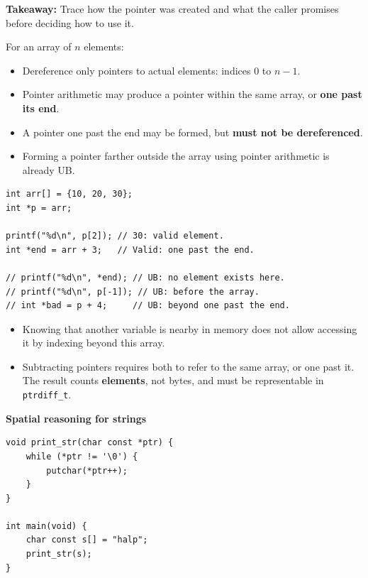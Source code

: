 \documentclass[11pt,a4paper]{article}
\begin{document}
\textbf{Takeaway:}
Trace how the pointer was created and what the caller promises
before deciding how to use it.


For an array of \(n\) elements:

\begin{itemize}
    \item Dereference only pointers to actual elements:
          indices \(0\) to \(n-1\).
    \item Pointer arithmetic may produce a pointer within the
          same array, or \textbf{one past its end}.
    \item A pointer one past the end may be formed, but
          \textbf{must not be dereferenced}.
    \item Forming a pointer farther outside the array using
          pointer arithmetic is already UB.
\end{itemize}

\begin{lstlisting}[style=cscode]
int arr[] = {10, 20, 30};
int *p = arr;

printf("%d\n", p[2]); // 30: valid element.
int *end = arr + 3;   // Valid: one past the end.

// printf("%d\n", *end); // UB: no element exists here.
// printf("%d\n", p[-1]); // UB: before the array.
// int *bad = p + 4;     // UB: beyond one past the end.
\end{lstlisting}

\begin{itemize}
    \item Knowing that another variable is nearby in memory does
          not allow accessing it by indexing beyond this array.
    \item Subtracting pointers requires both to refer to the same
          array, or one past it. The result counts
          \textbf{elements}, not bytes, and must be representable
          in \texttt{ptrdiff\_t}.
\end{itemize}

\textbf{Spatial reasoning for strings}

\begin{lstlisting}[style=cscode]
void print_str(char const *ptr) {
    while (*ptr != '\0') {
        putchar(*ptr++);
    }
}

int main(void) {
    char const s[] = "halp";
    print_str(s);
}
\end{lstlisting}
\end{document}
